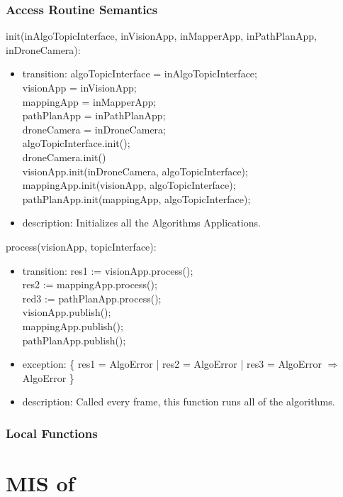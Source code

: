 \documentclass[12pt, titlepage]{article}
\begin{document}
\subsubsection{Access Routine Semantics}
\noindent init(inAlgoTopicInterface, inVisionApp, inMapperApp, inPathPlanApp, inDroneCamera):
\begin{itemize}
\item transition: 
algoTopicInterface = inAlgoTopicInterface; \\ 
visionApp = inVisionApp; \\
mappingApp = inMapperApp;\\
pathPlanApp = inPathPlanApp;\\
droneCamera = inDroneCamera;\\
algoTopicInterface.init(); \\ 
droneCamera.init()\\
visionApp.init(inDroneCamera, algoTopicInterface); \\ 
mappingApp.init(visionApp, algoTopicInterface); \\ 
pathPlanApp.init(mappingApp, algoTopicInterface); \\ 
\item description: Initializes all the Algorithms Applications.
\end{itemize}
\noindent process(visionApp, topicInterface):
\begin{itemize}
\item transition: res1 := visionApp.process(); \\
res2 := mappingApp.process(); \\
red3 := pathPlanApp.process(); \\
visionApp.publish(); \\
mappingApp.publish(); \\
pathPlanApp.publish(); \\
\item exception: \{ res1 = AlgoError | res2 = AlgoError | res3 = AlgoError $\Rightarrow$ AlgoError \}
\item description: Called every frame, this function runs all of the algorithms.
\end{itemize}
\subsubsection{Local Functions}
\newpage





\section{MIS of } \label{MIS_ALGO_MAIN} 
\end{document}
